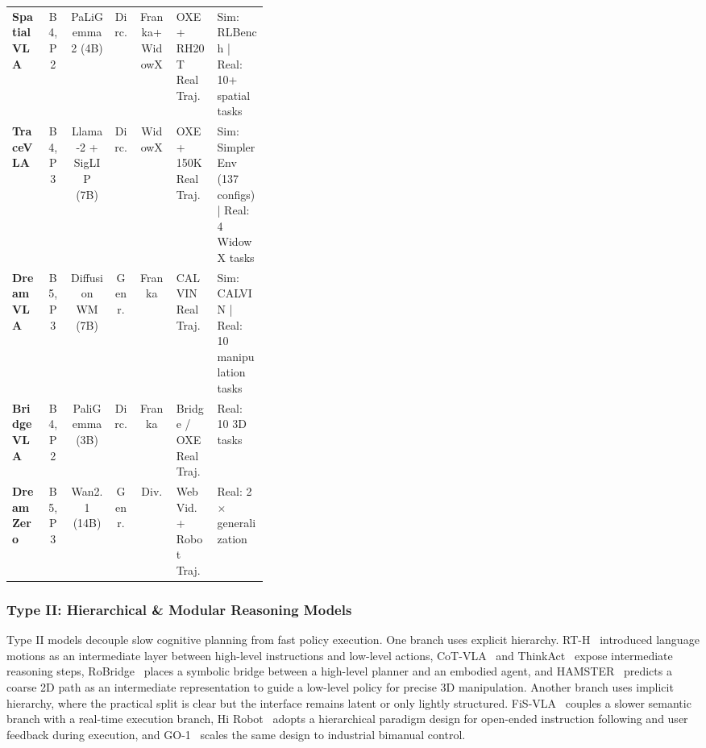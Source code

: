 \documentclass[acmsmall,screen,review]{acmart}
\begin{document}
\begin{table}[t!]
\begin{tabular}{
  l
  c
  c
  c
  c
  p{0.168\linewidth}
  p{0.205\linewidth}
}
\textbf{SpatialVLA}~\cite{qu2025spatialvla} & B4, P2 & PaLiGemma 2 (4B) & Dirc. & Franka+WidowX & OXE + RH20T Real Traj. & Sim: RLBench | Real: 10+ spatial tasks \\

\textbf{TraceVLA}~\cite{zheng2025tracevla} & B4, P3 & Llama-2 + SigLIP (7B) & Dirc. & WidowX & OXE + 150K Real Traj. & Sim: SimplerEnv (137 configs) | Real: 4 WidowX tasks \\

\textbf{DreamVLA}~\cite{zhang2025dreamvla} & B5, P3 & Diffusion WM (7B) & Genr. & Franka & CALVIN Real Traj. & Sim: CALVIN | Real: 10 manipulation tasks \\

\textbf{BridgeVLA}~\cite{li2025bridgevla} & B4, P2 & PaliGemma (3B) & Dirc. & Franka & Bridge / OXE Real Traj. & Real: 10 3D tasks \\

\textbf{DreamZero}~\cite{ye2026dreamzero} & B5, P3 & Wan2.1 (14B) & Genr. & Div. & Web Vid.\ + Robot Traj. & Real: 2$\times$ generalization \\

\bottomrule
\end{tabular}
\end{table}

\subsubsection{Type II\@: Hierarchical \& Modular Reasoning Models}\label{subsec:hierarchical_modular_models}

Type II models decouple slow cognitive planning from fast policy execution. One branch uses explicit hierarchy. 
RT-H~\cite{belkhale2024rth} introduced language motions as an intermediate layer between high-level instructions and low-level actions, 
CoT-VLA~\cite{zhao2025cotvla} and ThinkAct~\cite{huang2025thinkact} expose intermediate reasoning steps, 
RoBridge~\cite{zhang2025robridge} places a symbolic bridge between a high-level planner and an embodied agent, 
and HAMSTER~\cite{li2025hamster} predicts a coarse 2D path as an intermediate representation to guide a low-level policy for precise 3D manipulation.
Another branch uses implicit hierarchy, where the practical split is clear but the interface remains latent or only lightly structured. 
FiS-VLA~\cite{chen2025fis} couples a slower semantic branch with a real-time execution branch, 
Hi Robot~\cite{shi2025hirobot} adopts a hierarchical paradigm design for open-ended instruction following and user feedback during execution, 
and GO-1~\cite{agibot2025} scales the same design to industrial bimanual control.
\end{document}
